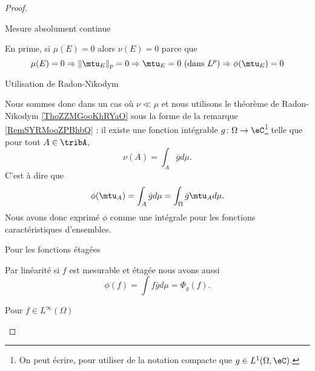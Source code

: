 \begin{proof}
\begin{subproof}
        \item[Mesure absolument continue]

            En prime, si \( \mu(E)=0\) alors \( \nu(E)=0\) parce que
            \begin{equation}
                \mu(E)=0\Rightarrow \| \mtu_E \|_p=0\Rightarrow \mtu_E=0\text{ (dans } L^p\text{)}\Rightarrow\phi(\mtu_E)=0
            \end{equation}

        \item[Utilisation de Radon-Nikodym]

            Nous sommes donc dans un cas où \( \nu\ll\mu\) et nous utilisons le théorème de Radon-Nikodym \ref{ThoZZMGooKhRYaO} sous la forme de la remarque \ref{RemSYRMooZPBhbQ} : il existe une fonction intégrable \( g\colon \Omega\to \eC\)\footnote{On peut écrire, pour utiliser de la notation compacte que \( g\in L^1(\Omega,\eC)\).} telle que pour tout \( A\in\tribA\),
            \begin{equation}
                \nu(A)=\int_A\bar gd\mu.
            \end{equation}
            C'est à dire que
            \begin{equation}
                \phi(\mtu_A)=\int_A\bar gd\mu=\int_{\Omega}\bar g\mtu_Ad\mu.
            \end{equation}
            Nous avons donc exprimé \( \phi\) comme une intégrale pour les fonctions caractéristiques d'ensembles.

        \item[Pour les fonctions étagées]

            Par linéarité si \( f\) est mesurable et étagée nous avons aussi
            \begin{equation}
                \phi(f)=\int f\bar gd\mu=\Phi_g(f).
            \end{equation}

        \item[Pour \( f\in L^{\infty}(\Omega)\)]


\end{subproof}
\end{proof}
